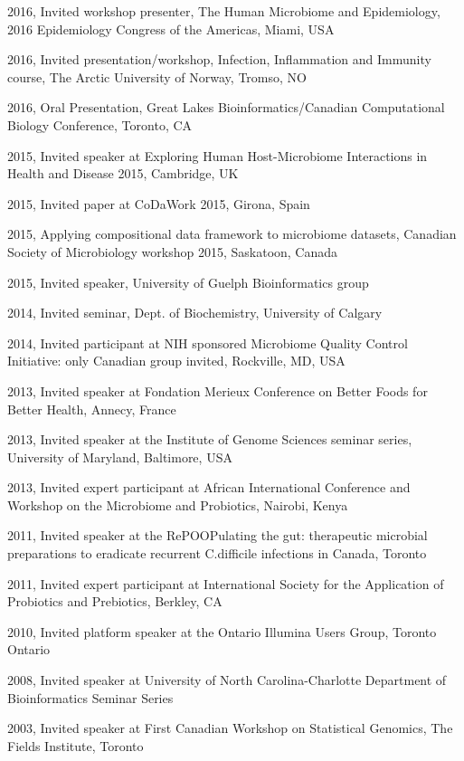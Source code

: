\documentclass[11pt]{article}
\begin{document}
\begin{description}
\item 2016,  Invited workshop presenter, The Human Microbiome and Epidemiology, 2016 Epidemiology Congress of the Americas, Miami, USA
\item 2016,  Invited presentation/workshop, Infection, Inflammation and Immunity course, The Arctic University of Norway, Tromso, NO
\item 2016,  Oral Presentation, Great Lakes Bioinformatics/Canadian Computational Biology Conference, Toronto, CA
\item 2015,  Invited speaker at Exploring Human Host-Microbiome Interactions in Health and Disease 2015, Cambridge, UK
\item 2015,  Invited paper at CoDaWork 2015, Girona, Spain
\item 2015,  Applying compositional data framework to microbiome datasets,  Canadian Society of Microbiology workshop 2015, Saskatoon, Canada
\item 2015,  Invited speaker, University of Guelph Bioinformatics group
\item 2014,     Invited seminar, Dept. of Biochemistry, University of Calgary
\item 2014, 	Invited participant at NIH sponsored Microbiome Quality Control Initiative: only Canadian group invited, Rockville, MD, USA
\item 2013, 	Invited speaker at Fondation Merieux Conference on Better Foods for Better Health, Annecy, France
\item 2013, 	Invited speaker at the Institute of Genome Sciences seminar series, University of Maryland, Baltimore, USA
\item 2013, 	Invited expert participant at African International Conference and Workshop on the Microbiome and Probiotics, Nairobi, Kenya
\item 2011, 	Invited speaker at the RePOOPulating the gut: therapeutic microbial preparations to eradicate recurrent C.difficile infections in Canada, Toronto
\item 2011, 	Invited expert participant at International Society for the Application of Probiotics and Prebiotics, Berkley, CA
\item 2010, 	Invited platform speaker at the Ontario Illumina Users Group, Toronto Ontario 
\item 2008, 	Invited speaker at University of North Carolina-Charlotte Department of Bioinformatics Seminar Series
\item 2003, Invited speaker at First Canadian Workshop on Statistical Genomics, The Fields Institute, Toronto 

\end{description}
\end{document}
